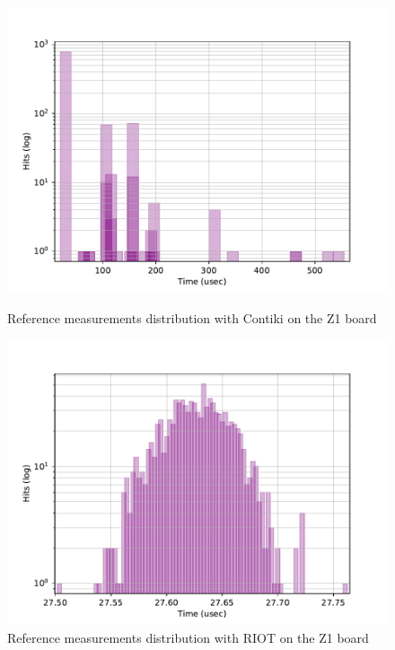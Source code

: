 \begin{figure}[!ht]
        \centering
        \includegraphics[scale=.7]{assets/reference-value-contiki-z1.pdf}
        \caption{Reference measurements distribution with Contiki on the Z1 board\label{fig:reference-value-contiki-z1}}
        \centering
        \includegraphics[scale=.7]{assets/reference-value-riot-z1.pdf}
        \caption{Reference measurements distribution with RIOT on the Z1 board\label{fig:reference-value-riot-z1}}
\end{figure}

